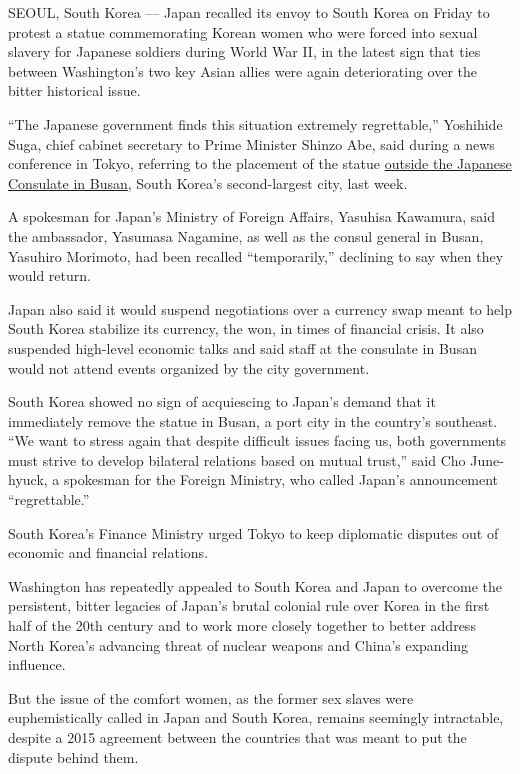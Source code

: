 SEOUL, South Korea --- Japan recalled its envoy to South Korea on Friday
to protest a statue commemorating Korean women who were forced into
sexual slavery for Japanese soldiers during World War II, in the latest
sign that ties between Washington's two key Asian allies were again
deteriorating over the bitter historical issue.

``The Japanese government finds this situation extremely regrettable,''
Yoshihide Suga, chief cabinet secretary to Prime Minister Shinzo Abe,
said during a news conference in Tokyo, referring to the placement of
the statue
\href{http://www.nytimes3xbfgragh.onion/2016/12/30/world/asia/south-korea-comfort-women-wwii-japan.html}{outside
the Japanese Consulate in Busan}, South Korea's second-largest city,
last week.

A spokesman for Japan's Ministry of Foreign Affairs, Yasuhisa Kawamura,
said the ambassador, Yasumasa Nagamine, as well as the consul general in
Busan, Yasuhiro Morimoto, had been recalled ``temporarily,'' declining
to say when they would return.

Japan also said it would suspend negotiations over a currency swap meant
to help South Korea stabilize its currency, the won, in times of
financial crisis. It also suspended high-level economic talks and said
staff at the consulate in Busan would not attend events organized by the
city government.

South Korea showed no sign of acquiescing to Japan's demand that it
immediately remove the statue in Busan, a port city in the country's
southeast. ``We want to stress again that despite difficult issues
facing us, both governments must strive to develop bilateral relations
based on mutual trust,'' said Cho June-hyuck, a spokesman for the
Foreign Ministry, who called Japan's announcement ``regrettable.''

South Korea's Finance Ministry urged Tokyo to keep diplomatic disputes
out of economic and financial relations.

Washington has repeatedly appealed to South Korea and Japan to overcome
the persistent, bitter legacies of Japan's brutal colonial rule over
Korea in the first half of the 20th century and to work more closely
together to better address North Korea's advancing threat of nuclear
weapons and China's expanding influence.

But the issue of the comfort women, as the former sex slaves were
euphemistically called in Japan and South Korea, remains seemingly
intractable, despite a 2015 agreement between the countries that was
meant to put the dispute behind them.

